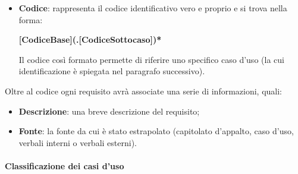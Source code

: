 \begin{itemize}
    \item \textbf{Codice}: rappresenta il codice identificativo vero e proprio e si trova nella forma:
    \begin{center}
        \textbf{[CodiceBase](.[CodiceSottocaso])*}
    \end{center}
    Il codice così formato permette di riferire uno specifico caso d'uso (la cui identificazione è spiegata nel paragrafo successivo).
\end{itemize}

Oltre al codice ogni requisito avrà associate una serie di informazioni, quali:
\begin{itemize}
    \item \textbf{Descrizione}: una breve descrizione del requisito;
    \item \textbf{Fonte}: la fonte da cui è stato estrapolato (capitolato d'appalto, caso d'uso, verbali interni o verbali esterni).
\end{itemize}

\paragraph{Classificazione dei casi d'uso}

